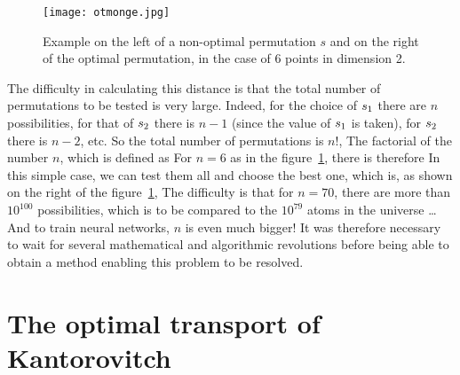 \begin{figure}\centering
	\texttt{[image: otmonge.jpg]}
\caption{\label{fig:otmonge} Example on the left of a non-optimal permutation $s$ and on the right of the optimal permutation, in the case of $6$ points in dimension 2.  }
\end{figure}

The difficulty in calculating this distance is that the total number of permutations to be tested is very large. Indeed, for the choice of $s_{1}$ there are $n$ possibilities, for that of $s_{2}$ there is $n-1$ (since the value of $s_{1}$ is taken), for $s_{2}$ there is $n-2$, etc. So the total number of permutations is $n!$, The factorial of the number $n$, which is defined as
For $n=6$ as in the figure~\ref{fig:otmonge}, there is therefore
In this simple case, we can test them all and choose the best one, which is, as shown on the right of the figure~\ref{fig:otmonge},
The difficulty is that for $n = 70$, there are more than $10^{100}$ possibilities, which is to be compared to the $10^{79}$ atoms in the universe \ldots And to train neural networks, $n$ is even much bigger!
%
It was therefore necessary to wait for several mathematical and algorithmic revolutions before being able to obtain a method enabling this problem to be resolved.


\section{The optimal transport of Kantorovitch}
\label{sec-kanto}

